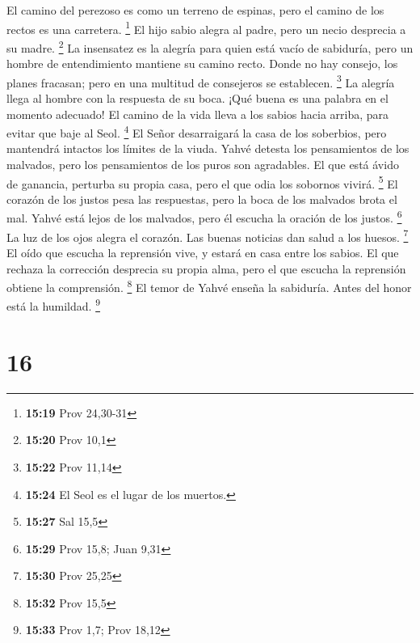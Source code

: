  El camino del perezoso es como un terreno de espinas,
pero el camino de los rectos es una carretera. \footnote{\textbf{15:19}
  Prov 24,30-31}  El hijo sabio alegra al padre, pero un
necio desprecia a su madre. \footnote{\textbf{15:20} Prov 10,1}
 La insensatez es la alegría para quien está vacío de
sabiduría, pero un hombre de entendimiento mantiene su camino recto.
 Donde no hay consejo, los planes fracasan; pero en una
multitud de consejeros se establecen. \footnote{\textbf{15:22} Prov
  11,14}  La alegría llega al hombre con la respuesta de
su boca. ¡Qué buena es una palabra en el momento adecuado!
 El camino de la vida lleva a los sabios hacia arriba,
para evitar que baje al Seol. \footnote{\textbf{15:24} El Seol es el
  lugar de los muertos.}  El Señor desarraigará la casa
de los soberbios, pero mantendrá intactos los límites de la viuda.
 Yahvé detesta los pensamientos de los malvados, pero los
pensamientos de los puros son agradables.  El que está
ávido de ganancia, perturba su propia casa, pero el que odia los
sobornos vivirá. \footnote{\textbf{15:27} Sal 15,5}  El
corazón de los justos pesa las respuestas, pero la boca de los malvados
brota el mal.  Yahvé está lejos de los malvados, pero él
escucha la oración de los justos. \footnote{\textbf{15:29} Prov 15,8;
  Juan 9,31}  La luz de los ojos alegra el corazón. Las
buenas noticias dan salud a los huesos. \footnote{\textbf{15:30} Prov
  25,25}  El oído que escucha la reprensión vive, y
estará en casa entre los sabios.  El que rechaza la
corrección desprecia su propia alma, pero el que escucha la reprensión
obtiene la comprensión. \footnote{\textbf{15:32} Prov 15,5}
 El temor de Yahvé enseña la sabiduría. Antes del honor
está la humildad. \footnote{\textbf{15:33} Prov 1,7; Prov 18,12}

\hypertarget{section-15}{%
\section{16}\label{section-15}}

